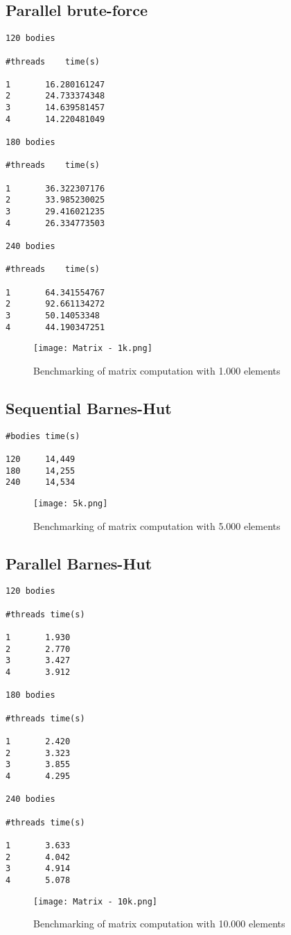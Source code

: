 \documentclass{article}
\begin{document}
\subsection{Parallel brute-force}
\begin{verbatim}
120 bodies

#threads    time(s)

1       16.280161247
2       24.733374348
3       14.639581457
4       14.220481049

180 bodies 

#threads    time(s)

1       36.322307176  
2       33.985230025  
3       29.416021235
4       26.334773503

240 bodies

#threads    time(s)

1       64.341554767 
2       92.661134272 
3       50.14053348 
4       44.190347251
\end{verbatim}
\begin{figure}[h]
\centering
\texttt{[image: Matrix - 1k.png]}
\caption{Benchmarking of matrix computation with 1.000 elements}
\end{figure}      

\subsection{Sequential Barnes-Hut}
\begin{verbatim}
#bodies time(s)

120     14,449
180     14,255
240     14,534
\end{verbatim}
\begin{figure}[h]
\centering
\texttt{[image: 5k.png]}
\caption{Benchmarking of matrix computation with 5.000 elements}
\end{figure}      
\clearpage

\subsection{Parallel Barnes-Hut}
\begin{verbatim}
120 bodies

#threads time(s)

1       1.930
2       2.770
3       3.427
4       3.912

180 bodies

#threads time(s)

1       2.420
2       3.323
3       3.855
4       4.295

240 bodies

#threads time(s)

1       3.633
2       4.042
3       4.914
4       5.078
\end{verbatim}
\begin{figure}[h]
\centering
\texttt{[image: Matrix - 10k.png]}
\caption{Benchmarking of matrix computation with 10.000 elements}
\end{figure}
\end{document}
